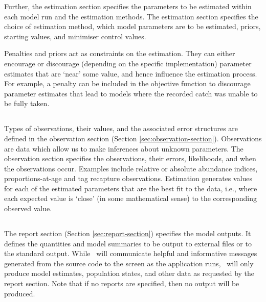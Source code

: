 Further, the estimation section specifies the parameters to be estimated within each model run and the estimation methods. The estimation section specifies the choice of estimation method, which model parameters are to be estimated, priors, starting values, and minimiser control values.

Penalties and priors act as constraints on the estimation. They can either encourage or discourage (depending on the specific implementation) parameter estimates that are `near' some value, and hence influence the estimation process. For example, a penalty can be included in the objective function to discourage parameter estimates that lead to models where the recorded catch was unable to be fully taken.

\subsection{}

Types of observations, their values, and the associated error structures are defined in the observation section (Section \ref{sec:observation-section}). Observations are data which allow us to make inferences about unknown parameters. The observation section specifies the observations, their errors, likelihoods, and when the observations occur. Examples include relative or absolute abundance indices, proportions-at-age and tag recapture observations. Estimation generates values for each of the estimated parameters that are the best fit to the data, i.e., where each expected value is `close' (in some mathematical sense) to the corresponding observed value.

\subsection{}

The report section (Section \ref{sec:report-section}) specifies the model outputs. It defines the quantities and model summaries to be output to external files or to the standard output. While \CNAME\ will communicate  helpful and informative messages generated from the source code to the screen as the application runs, \CNAME\ will only produce model estimates, population states, and other data as requested by the report section. Note that if no reports are specified, then no output will be produced.
